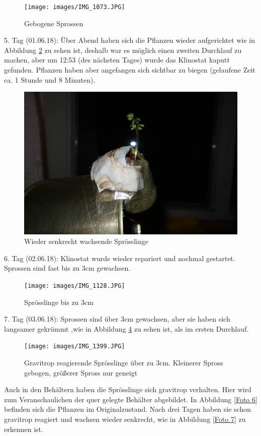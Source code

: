 \documentclass[
11pt, 
ngerman,
listof=totocnumbered,
oneside,
bibliography=totocnumbered,
abstracton
]{scrreprt}
\begin{document}
\begin{figure}[H]
	  \centering 
	  \texttt{[image: images/IMG\_1073.JPG]}
	  \caption{Gebogene Sprossen \label{Foto 2}}
\end{figure}



5. Tag (01.06.18): Über Abend haben sich die Pflanzen wieder aufgerichtet wie in Abbildung \ref{Foto 3} zu sehen ist, deshalb war es möglich einen zweiten Durchlauf zu machen, aber um 12:53 (des nächsten Tages) wurde das Klinostat kaputt gefunden. Pflanzen haben aber angefangen sich sichtbar zu biegen (gelaufene Zeit ca. 1 Stunde und 8 Minuten).

\begin{figure}[H]
	\centering 
	\includegraphics[width = .5\linewidth]{images/IMG_1114.JPG}
	\caption{Wieder senkrecht wachsende Sprösslinge \label{Foto 3}}
\end{figure}

6. Tag (02.06.18): Klinostat wurde wieder repariert und nochmal gestartet. Sprossen sind fast bis zu 3cm gewachsen.

\begin{figure}[H]
	\centering 
	\texttt{[image: images/IMG\_1128.JPG]}
	\caption{Sprösslinge bis zu 3cm \label{Foto 4}}
\end{figure}

7. Tag (03.06.18): Sprossen sind über 3cm gewachsen, aber sie haben sich langsamer gekrümmt ,wie in Abbildung \ref{Foto 5} zu sehen ist, als im ersten Durchlauf.

\begin{figure}[H]
	 \centering 
  \texttt{[image: images/IMG\_1399.JPG]}
  	\caption{Gravitrop reagierende Sprösslinge über zu 3cm. Kleinerer Spross gebogen, größerer Spross nur geneigt \label{Foto 5}}
\end{figure} 

 Auch in den Behältern haben die Sprösslinge sich gravitrop verhalten. Hier wird zum Veranschaulichen der quer gelegte Behälter abgebildet.
 In Abbildung \ref{Foto 6} befinden sich die Pflanzen im Originalzustand. Nach drei Tagen haben sie schon gravitrop reagiert und wachsen wieder senkrecht, wie in Abbildung \ref{Foto 7} zu erkennen ist.
\end{document}
